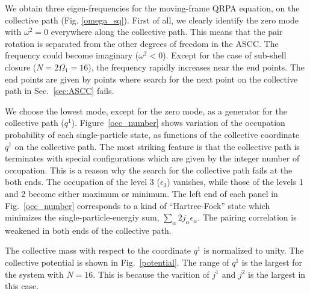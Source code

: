 \documentclass[%
superscriptaddress,
showpacs,
nofootinbib,
amsmath,amssymb,
aps,
prc,
twocolumn,
floatfix ]%
{revtex4-1}
\begin{document}
We obtain three eigen-frequencies for the moving-frame QRPA equation, 
on the collective path (Fig. \ref{omega_sq}). 
First of all, we clearly identify the zero mode with $\omega^2=0$
everywhere along the collective path.
This means that the pair rotation is separated from the other
degrees of freedom in the ASCC.
The frequency could become imaginary ($\omega^2<0$).
Except for the case of sub-shell closure ($N=2\Omega_1=16$),
the frequency rapidly increases near the end points.
The end points are given by points where search for the next point
on the collective path in Sec.~\ref{sec:ASCC} fails.

We choose the lowest mode, except for the zero mode,
as a generator for the collective path ($q^1$).
Figure~\ref{occ_number} shows variation of the occupation probability
of each single-particle state, as functions of the collective
coordinate $q^1$ on the collective path.
The most striking feature is that the collective path is terminates
with special configurations which are given by the integer number
of occupation.
This is a reason why the search for the collective path fails
at the both ends.
The occupation of the level 3 ($\epsilon_3$) vanishes, while
those of the levels 1 and 2 become either maximum or minimum.
The left end of each panel in Fig.~\ref{occ_number} corresponds to 
a kind of ``Hartree-Fock'' state which minimizes
the single-particle-energiy sum, $\sum_\alpha 2j_\alpha \epsilon_\alpha$.
The pairing correlation is weakened in both ends of the
collective path.

The collective mass with respect to the coordinate $q^1$ is normalized
to unity.
The collective potential is shown in Fig.~\ref{potential}.
The range of $q^1$ is the largest for the system with $N=16$.
This is because the varition of $j^1$ and $j^2$ is the largest in
this case.
\end{document}
